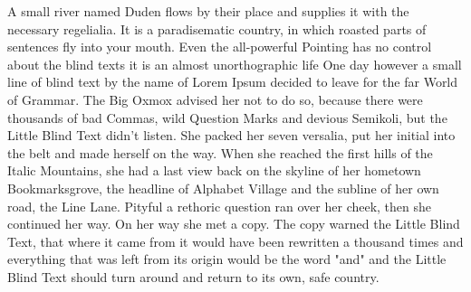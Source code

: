 \documentclass{xminimal}
\begin{document}
A small river named Duden flows by their place and supplies it with
the necessary regelialia. It is a paradisematic country, in which roasted parts
of sentences fly into your mouth. Even the all-powerful Pointing has no control
about the blind texts it is an almost unorthographic life One day however
a small line of blind text by the name of Lorem Ipsum decided to leave for
the far World of Grammar. The Big Oxmox advised her not to do so, because there
were thousands of bad Commas, wild Question Marks and devious Semikoli,
but the Little Blind Text didn’t listen. She packed her seven versalia, put her
initial into the belt and made herself on the way. When she reached the first
hills of the Italic Mountains, she had a last view back on the skyline of her
hometown Bookmarksgrove, the headline of Alphabet Village and the subline of her
own road, the Line Lane. Pityful a rethoric question ran over her cheek,
then she continued her way. On her way she met a copy. The copy warned
the Little Blind Text, that where it came from it would have been rewritten
a thousand times and everything that was left from its origin would be
the word "and" and the Little Blind Text should turn around and return to
its own, safe country.
\end{document}
